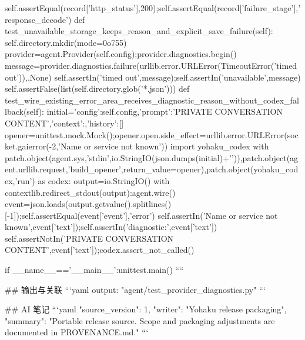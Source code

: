         self.assertEqual(record['http_status'],200);self.assertEqual(record['failure_stage'],'response_decode')
    def test_unavailable_storage_keeps_reason_and_explicit_save_failure(self):
        self.directory.mkdir(mode=0o755)
        provider=agent.Provider(self.config);provider.diagnostics.begin()
        message=provider.diagnostics.failure(urllib.error.URLError(TimeoutError('timed out')),{},None)
        self.assertIn('timed out',message);self.assertIn('unavailable',message)
        self.assertFalse(list(self.directory.glob('*.json')))
    def test_wire_existing_error_area_receives_diagnostic_reason_without_codex_fallback(self):
        initial={'config':self.config,'prompt':'PRIVATE CONVERSATION CONTENT','context':{},'history':[]}
        opener=unittest.mock.Mock();opener.open.side_effect=urllib.error.URLError(socket.gaierror(-2,'Name or service not known'))
        import yohaku_codex
        with patch.object(agent.sys,'stdin',io.StringIO(json.dumps(initial)+'\n')),patch.object(agent.urllib.request,'build_opener',return_value=opener),patch.object(yohaku_codex,'run') as codex:
            output=io.StringIO()
            with contextlib.redirect_stdout(output):agent.wire()
        event=json.loads(output.getvalue().splitlines()[-1]);self.assertEqual(event['event'],'error')
        self.assertIn('Name or service not known',event['text']);self.assertIn('diagnostic:',event['text'])
        self.assertNotIn('PRIVATE CONVERSATION CONTENT',event['text']);codex.assert_not_called()


if __name__=='__main__':unittest.main()
````

## 输出与关联
```yaml
output: "agent/test_provider_diagnostics.py"
```

## AI 笔记
```yaml
{"source_version": 1, "writer": "Yohaku release packaging", "summary": "Portable release source. Scope and packaging adjustments are documented in PROVENANCE.md."}
```
